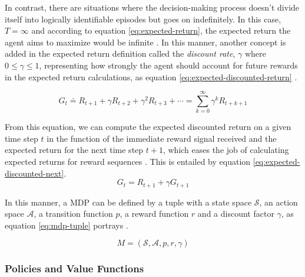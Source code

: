 \documentclass[11pt,a4paper]{article}
\begin{document}
In contrast, there are situations where the decision-making process doesn't divide itself into logically identifiable episodes but goes on indefinitely. In this case, $T = \infty$ and according to equation \ref{eq:expected-return}, the expected return the agent aims to maximize would be infinite \cite{suttonReinforcementLearningIntroduction2014}. In this manner, another concept is added in the expected return definition called the \textit{discount rate}, $\gamma$ where $0 \leq \gamma \leq 1$, representing how strongly the agent should account for future rewards in the expected return calculations, as equation \ref{eq:expected-discounted-return} \cite{suttonReinforcementLearningIntroduction2014}.

\begin{equation} \label{eq:expected-discounted-return}
    G_t \doteq R_{t+1} + \gamma R_{t+2} + \gamma^2 R_{t+3} + \cdots = \sum^\infty_{k = 0} \gamma^k R_{t+k+1}
\end{equation}

From this equation, we can compute the expected discounted return on a given time step $t$ in the function of the immediate reward signal received and the expected return for the next time step $t +1$, which eases the job of calculating expected returns for reward sequences \cite{suttonReinforcementLearningIntroduction2014}. This is entailed by equation \ref{eq:expected-discounted-next}.
\begin{equation} \label{eq:expected-discounted-next}
    G_t = R_{t+1} + \gamma G_{t+1}
\end{equation}

In this manner, a \ac{MDP} can be defined by a tuple with a state space $\mathcal{S}$, an action space $\mathcal{A}$, a transition function $p$, a reward function $r$ and a discount factor $\gamma$, as equation \ref{eq:mdp-tuple} portrays \cite{brunskillCS234ReinforcementLearning}.

\begin{equation} \label{eq:mdp-tuple}
    M = (\mathcal{S}, \mathcal{A}, p, r, \gamma)
\end{equation}

\subsubsection{Policies and Value Functions}
\end{document}
